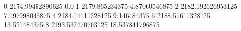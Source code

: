 0 2174.99462890625 0.0
1 2179.865234375 4.87060546875
2 2182.192626953125 7.197998046875
4 2184.14111328125 9.146484375
6 2188.51611328125 13.521484375
8 2193.532470703125 18.537841796875
